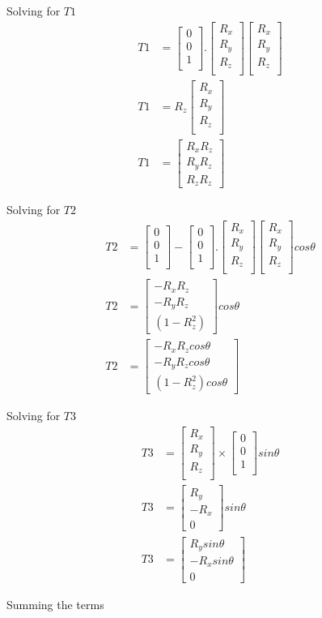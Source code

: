 \documentclass{article}
\newcommand{\zaxis}{
    \begin{bmatrix}
        0 \\
        0 \\
        1 \\
    \end{bmatrix}
}
\newcommand{\rotAxis}{
    \begin{bmatrix}
        R_x \\
        R_y \\
        R_z \\
    \end{bmatrix}
}
\newcommand{\vparallelForZ}{
    \zaxis . \rotAxis 
    \rotAxis
}
\begin{document}
    Solving for $T1$
    \begin{align}
        T1 &= \vparallelForZ \\
        T1 &= R_z \rotAxis \\
        T1 &= \begin{bmatrix} R_xR_z \\ R_yR_z \\ R_zR_z \end{bmatrix} 
    \end{align}
    
    Solving for $T2$
    \begin{align}
        T2 &= \zaxis - \vparallelForZ cos\theta \\
        T2 &= \begin{bmatrix} -R_xR_z \\ -R_yR_z \\ (1-R_z^2) \end{bmatrix} cos\theta \\
        T2 &= \begin{bmatrix} -R_xR_zcos\theta \\ -R_yR_zcos\theta \\ (1-R_z^2)cos\theta \end{bmatrix}
    \end{align}

    Solving for $T3$
    \begin{align}
        T3 &= \rotAxis \times \zaxis sin\theta \\
        T3 &= \begin{bmatrix} R_y \\ -R_x \\ 0 \end{bmatrix}sin\theta\\
        T3 &= \begin{bmatrix} R_ysin\theta \\ -R_xsin\theta \\ 0 \end{bmatrix}
    \end{align}

    Summing the terms 
\end{document}
